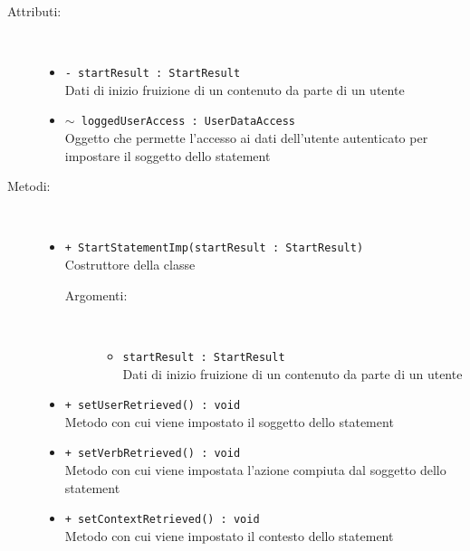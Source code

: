 \documentclass[../Tesi.tex]{subfiles}
\begin{document}
		\begin{description}
			\item[Attributi:] \
			\begin{itemize}
				\item \texttt{- startResult : StartResult}\\
				Dati di inizio fruizione di un contenuto da parte di un utente

				\item \texttt{$\sim$ loggedUserAccess : UserDataAccess}\\
				Oggetto che permette l'accesso ai dati dell'utente autenticato per impostare il soggetto dello statement
			\end{itemize}

			\item[Metodi:] \
			\begin{itemize}
				\item \texttt{+ StartStatementImp(startResult : StartResult)}\\
				Costruttore della classe 
				\begin{description}
					\item[Argomenti:] \
					\begin{itemize}
						\item \texttt{startResult : StartResult}\\
						Dati di inizio fruizione di un contenuto da parte di un utente
					\end{itemize}
				\end{description}

				\item \texttt{+ setUserRetrieved() : void}\\
				Metodo con cui viene impostato il soggetto dello statement

				\item \texttt{+ setVerbRetrieved() : void}\\
				Metodo con cui viene impostata l'azione compiuta dal soggetto dello statement

				\item \texttt{+ setContextRetrieved() : void}\\
				Metodo con cui viene impostato il contesto dello statement
			\end{itemize}
		\end{description}
\end{document}

